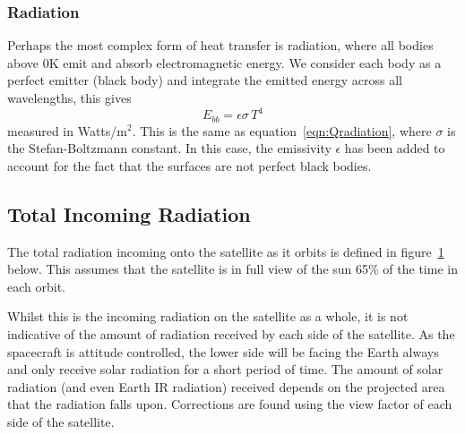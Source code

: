 \subsubsection{Radiation}
Perhaps the most complex form of heat transfer is radiation, where all bodies above 0K emit and absorb electromagnetic energy. We consider each body as a perfect emitter (black body) and integrate the emitted energy across all wavelengths, this gives
\begin{equation}
E_{bb} = \epsilon\sigma\,T^4
\end{equation}
measured in Watts/m$^2$. This is the same as equation~\ref{eqn:Qradiation}, where $\sigma$ is the Stefan-Boltzmann constant. In this case, the emissivity $\epsilon$ has been added to account for the fact that the surfaces are not perfect black bodies.

\subsection{Total Incoming Radiation}
The total radiation incoming onto the satellite as it orbits is defined in figure~\ref{plot:incomingradiation} below. This assumes that the satellite is in full view of the sun 65\% of the time in each orbit.
\begin{figure}[H]
    \label{plot:incomingradiation}
\end{figure}
\noindent
Whilst this is the incoming radiation on the satellite as a whole, it is not indicative of the amount of radiation received by each side of the satellite. As the spacecraft is attitude controlled, the lower side will be facing the Earth always and only receive solar radiation for a short period of time. The amount of solar radiation (and even Earth IR radiation) received depends on the projected area that the radiation falls upon. Corrections are found using the view factor of each side of the satellite.

